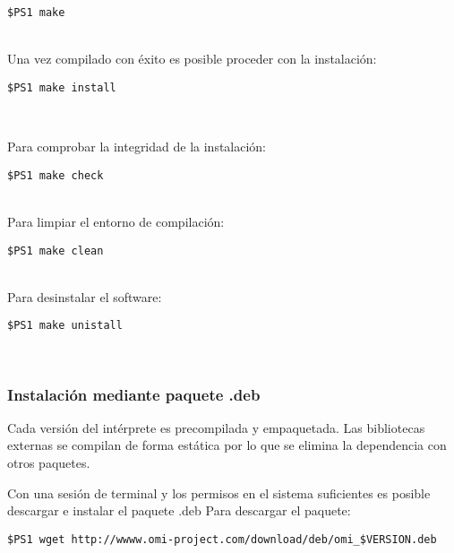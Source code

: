 \begin{lstlisting}
$PS1 make 
\end{lstlisting}
\hfill\\

Una vez compilado con éxito es posible proceder con la instalación:\\
\begin{lstlisting}
$PS1 make install
\end{lstlisting}
\hfill\\
\pagebreak

Para comprobar la integridad de la instalación:\\
\begin{lstlisting}
$PS1 make check
\end{lstlisting}
\hfill\\


Para limpiar el entorno de compilación:\\
\begin{lstlisting}
$PS1 make clean
\end{lstlisting}
\hfill\\

Para desinstalar el software:\\
\begin{lstlisting}
$PS1 make unistall
\end{lstlisting}
\hfill\\

\subsubsection{Instalación mediante paquete .deb}\label{sec:deb_pack}
Cada versión del intérprete es precompilada y empaquetada. Las bibliotecas externas se compilan
de forma estática por lo que se elimina la dependencia con otros paquetes.

Con una sesión de terminal y los permisos en el sistema suficientes es posible descargar e instalar el paquete .deb
Para descargar el paquete:\\

\begin{lstlisting}
$PS1 wget http://wwww.omi-project.com/download/deb/omi_$VERSION.deb
\end{lstlisting}
\hfill\\

